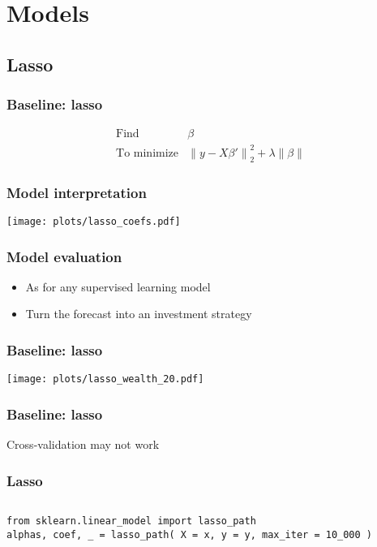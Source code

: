 \documentclass[a4paper,12pt,compress,serif]{beamer}
\def\n#1{\left\|#1\right\|}
\begin{document}
\section{Models}
\frame{\tableofcontents[currentsection]}

\subsection{Lasso}
\begin{frame}
  \frametitle{Baseline: lasso}
  \[
  \begin{array}{ll}
    \text{Find} & \beta \\
    \text{To minimize} & \n{ y - X \beta ' }_2^2 + \lambda \n{ \beta }
  \end{array}
  \]
\end{frame}

\begin{frame}
  \frametitle{Model interpretation}
  \texttt{[image: plots/lasso\_coefs.pdf]}
\end{frame}

\begin{frame}
  \frametitle{Model evaluation}
  \begin{itemize}
  \item As for any supervised learning model
  \item Turn the forecast into an investment strategy
  \end{itemize}
\end{frame}

\begin{frame}
  \frametitle{Baseline: lasso}
  \texttt{[image: plots/lasso\_wealth\_20.pdf]}
\end{frame}

\begin{frame}
  \frametitle{Baseline: lasso}
  Cross-validation may not work
\end{frame}

\begin{frame}[fragile]
  \frametitle{Lasso}
  \begin{columns}
    \column{\dimexpr\paperwidth-40pt}
\begin{verbatim}
from sklearn.linear_model import lasso_path
alphas, coef, _ = lasso_path( X = x, y = y, max_iter = 10_000 )
\end{verbatim}
  \end{columns}
\end{frame}
\end{document}
